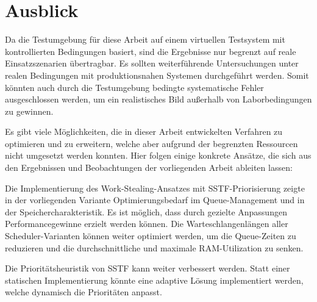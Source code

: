 \chapter{Ausblick}
\label{ch:chapter06}



\begin{sloppypar}

\noindent Da die Testumgebung für diese Arbeit auf einem virtuellen Testsystem mit kontrollierten Bedingungen basiert, 
sind die Ergebnisse nur begrenzt auf reale Einsatzszenarien übertragbar.
Es sollten weiterführende Untersuchungen unter realen Bedingungen mit produktionsnahen Systemen durchgeführt werden.
Somit könnten auch durch die Testumgebung bedingte systematische Fehler ausgeschlossen werden, um ein realistisches Bild außerhalb von
Laborbedingungen zu gewinnen.

\vspace{7.56mm}

\noindent Es gibt viele Möglichkeiten, die in dieser Arbeit entwickelten Verfahren zu optimieren und zu erweitern, welche aber aufgrund der begrenzten Ressourcen nicht umgesetzt werden konnten.
Hier folgen einige konkrete Ansätze, die sich aus den Ergebnissen und Beobachtungen der vorliegenden Arbeit ableiten lassen:

\vspace{7.56mm}

\noindent Die Implementierung des Work-Stealing-Ansatzes mit \acs{SSTF}-Priorisierung zeigte in der vorliegenden Variante Optimierungsbedarf im Queue-Management und in der Speichercharakteristik.
Es ist möglich, dass durch gezielte Anpassungen Performancegewinne erzielt werden können.
Die Warteschlangenlängen aller Scheduler-Varianten können weiter optimiert werden, um die Queue-Zeiten zu reduzieren und die durchschnittliche und maximale \acs{RAM}-Utilization zu senken.

\vspace{7.56mm}

\noindent Die Prioritätsheuristik von \acs{SSTF} kann weiter verbessert werden. 
Statt einer statischen Implementierung könnte eine adaptive Lösung implementiert werden, 
welche dynamisch die Prioritäten anpasst.

\vspace{7.56mm}


\end{sloppypar}
